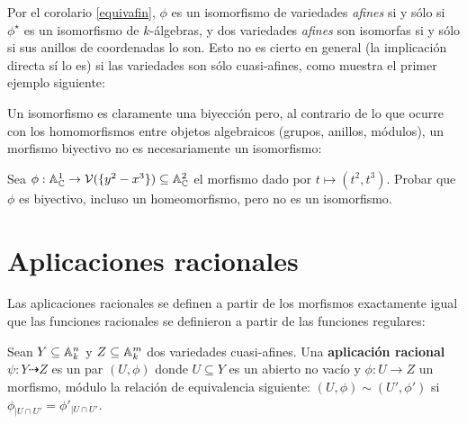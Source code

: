 \documentclass[ACGA.tex]{subfiles}
\begin{document}
 Por el corolario \ref{equivafin}, $\phi$ es un isomorfismo de variedades \emph{afines} si y sólo si $\phi^\star$ es un isomorfismo de $k$-álgebras, y dos variedades \emph{afines} son isomorfas si y sólo si sus anillos de coordenadas lo son. Esto no es cierto en general (la implicación directa sí lo es) si las variedades son sólo cuasi-afines, como muestra el primer ejemplo siguiente:


Un isomorfismo es claramente una biyección pero, al contrario de lo que ocurre con los homomorfismos entre objetos algebraicos (grupos, anillos, módulos), un morfismo biyectivo no es necesariamente un isomorfismo:

\begin{ejer}
 Sea $\phi:\mathbb{A}^1_{\mathbb{C}}\to\mathcal{V}(\{y^2-x^3\})\subseteq\mathbb{A}^2_{\mathbb{C}}$ el morfismo dado por $t\mapsto (t^2,t^3)$. Probar que $\phi$ es biyectivo, incluso un homeomorfismo, pero no es un isomorfismo.
\end{ejer}

\section{Aplicaciones racionales}

Las aplicaciones racionales se definen a partir de los morfismos exactamente igual que las funciones racionales se definieron a partir de las funciones regulares:

\begin{defi}
 Sean $Y\subseteq\mathbb{A}^n_k$ y $Z\subseteq\mathbb{A}^m_k$ dos variedades cuasi-afines. Una {\bf aplicación racional} $\psi:Y\dashrightarrow Z$ es un par $(U,\phi)$ donde $U\subseteq Y$ es un abierto no vacío y $\phi:U\to Z$ un morfismo, módulo la relación de equivalencia siguiente: $(U,\phi)\sim(U',\phi')$ si $\phi_{|U\cap U'}=\phi'_{|U\cap U'}$.
\end{defi}
\end{document}
